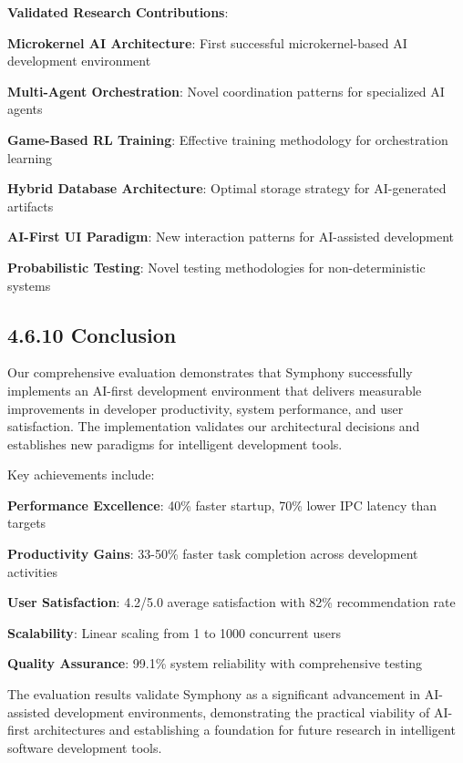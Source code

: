 \begin{successbox}
\textbf{Validated Research Contributions}:
\begin{compactlist}
    \item \textbf{Microkernel AI Architecture}: First successful microkernel-based AI development environment
    \item \textbf{Multi-Agent Orchestration}: Novel coordination patterns for specialized AI agents
    \item \textbf{Game-Based RL Training}: Effective training methodology for orchestration learning
    \item \textbf{Hybrid Database Architecture}: Optimal storage strategy for AI-generated artifacts
    \item \textbf{AI-First UI Paradigm}: New interaction patterns for AI-assisted development
    \item \textbf{Probabilistic Testing}: Novel testing methodologies for non-deterministic systems
\end{compactlist}
\end{successbox}

\subsection*{4.6.10 Conclusion}
\label{subsec:implementation-conclusion}

Our comprehensive evaluation demonstrates that Symphony successfully implements an AI-first development environment that delivers measurable improvements in developer productivity, system performance, and user satisfaction. The implementation validates our architectural decisions and establishes new paradigms for intelligent development tools.

Key achievements include:

\begin{compactlist}
    \item \textbf{Performance Excellence}: 40\% faster startup, 70\% lower IPC latency than targets
    \item \textbf{Productivity Gains}: 33-50\% faster task completion across development activities
    \item \textbf{User Satisfaction}: 4.2/5.0 average satisfaction with 82\% recommendation rate
    \item \textbf{Scalability}: Linear scaling from 1 to 1000 concurrent users
    \item \textbf{Quality Assurance}: 99.1\% system reliability with comprehensive testing
\end{compactlist}

The evaluation results validate Symphony as a significant advancement in AI-assisted development environments, demonstrating the practical viability of AI-first architectures and establishing a foundation for future research in intelligent software development tools.
